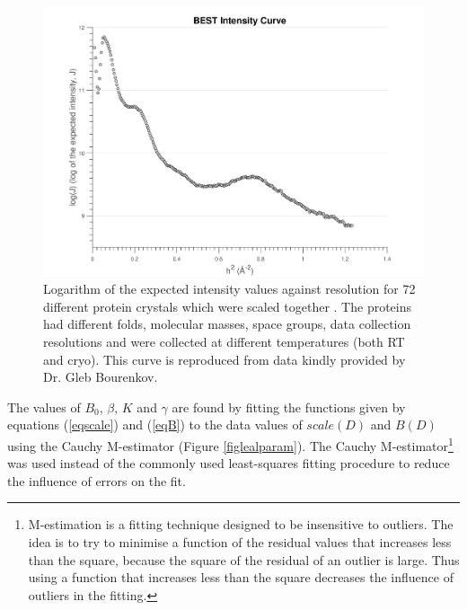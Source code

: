 \begin{figure}
    \centering
    \includegraphics[width=1\textwidth]{figures/dwd/bestcurve.pdf}
    \caption[\textit{BEST} intensity curve.]{Logarithm of the expected intensity values against resolution for 72 different protein crystals which were scaled together \cite{popov2003}. The proteins had different folds, molecular masses, space groups, data collection resolutions and were collected at different temperatures (both RT and cryo).
	This curve is reproduced from data kindly provided by Dr. Gleb Bourenkov.}
    \label{fig:BEST curve}
\end{figure}
The values of $B_0$, $\beta$, $K$ and $\gamma$ are found by fitting the functions given by equations (\ref{eqscale}) and (\ref{eqB}) to the data values of $scale(D)$ and $B(D)$ using the Cauchy M-estimator (Figure \ref{figlealparam}).
The Cauchy M-estimator\footnote{M-estimation is a fitting technique designed to be insensitive to outliers. The idea is to try to minimise a function of the residual values that increases less than the square, because the square of the residual of an outlier is large. Thus using a function that increases less than the square decreases the influence of outliers in the fitting.} was used instead of the commonly used least-squares fitting procedure to reduce the influence of errors on the fit.
